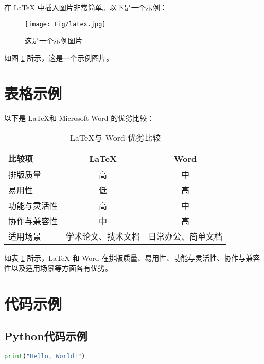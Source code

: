 \documentclass[UTF8,AutoFakeBold=1,AutoFakeSlant,zihao=-4]{SCAU}
\begin{document}
{在 LaTeX 中插入图片非常简单。以下是一个示例：

\begin{figure}[h] %
  \centering
  \texttt{[image: Fig/latex.jpg]} %
  \caption{这是一个示例图片}    %
  \label{latex}          %
\end{figure}

如图 \ref{latex} 所示，这是一个示例图片。



\section{表格示例}


以下是 \LaTeX 和 Microsoft Word 的优劣比较：

\begin{table}[h] %
  \centering
  \caption{\LaTeX  与 Word 优劣比较} %
  \label{tab:latex-vs-word} %
  \begin{tabular}{lcc} %
    \toprule %
    \textbf{比较项} & \textbf{\LaTeX} & \textbf{Word} \\
    \midrule %
    排版质量 & 高 & 中 \\
    易用性 & 低 & 高 \\
    功能与灵活性 & 高 & 中 \\
    协作与兼容性 & 中 & 高 \\
    适用场景 & 学术论文、技术文档 & 日常办公、简单文档 \\
    \bottomrule %
    
  \end{tabular}
\end{table}

如表 \ref{tab:latex-vs-word} 所示，LaTeX 和 Word 在排版质量、易用性、功能与灵活性、协作与兼容性以及适用场景等方面各有优劣\cite{bai2002kuo}\cite{xu2024lun}。

\section{代码示例}

\subsection{Python代码示例}
\begin{lstlisting}[language=Python]
print("Hello, World!")
\end{lstlisting}

}
\end{document}
